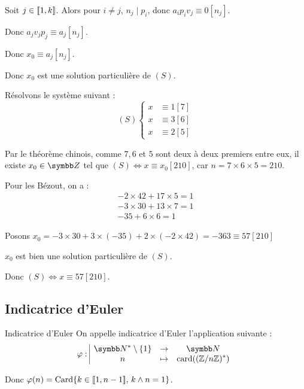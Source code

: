 Soit $j \in [\![1, k]\!]$. Alors pour $i \neq j$, $n_j \mid p_i$, donc $a_ip_iv_j \equiv 0 [n_j]$.

Donc $a_j v_j p_j \equiv a_j [n_j]$.

Donc $x_0 \equiv a_j [n_j]$.

Donc $x_0$ est une solution particulière de $(S)$.

\begin{exemple}
    Résolvons le système suivant : 
    \[
        (S) \left\{ 
            \begin{aligned}
                x & \equiv 1 [7] \\
                x & \equiv 3 [6] \\
                x & \equiv 2 [5]
            \end{aligned}
        \right.
    \]

    Par le théorème chinois, comme $7, 6$ et $5$ sont deux à deux premiers entre eux, 
    il existe $x_0 \in \Z$ tel que $(S) \Leftrightarrow x \equiv x_0 [210]$, car 
    $n = 7 \times 6 \times 5 = 210$.

    Pour les Bézout, on a :
    \[
        \begin{array}{rcl}
            -2 \times 42 + 17 \times 5 = 1 \\
            -3 \times 30 + 13 \times 7 = 1 \\
            - 35 + 6 \times 6 = 1
        \end{array}
    \]

    Posons $x_0 = -3 \times 30 + 3 \times (-35) + 2 \times (-2 \times 42) = -363 \equiv 57 [210] $

    $x_0$ est bien une solution particulière de $(S)$.

    Donc $(S) \Leftrightarrow x \equiv 57 [210]$.
\end{exemple}

\subsection{Indicatrice d'Euler}

\begin{definition}{Indicatrice d'Euler}{}
    On appelle indicatrice d'Euler l'application suivante : 
    \[\fonction{\varphi}{\N^* \setminus \{1 \}}{\N}{n}{\operatorname{card}((\zz n)^*)}\]

    Donc $\varphi(n) = \operatorname{Card}\{ k \in [\![1, n - 1]\!] , \, k \wedge n = 1\}$.
\end{definition}

